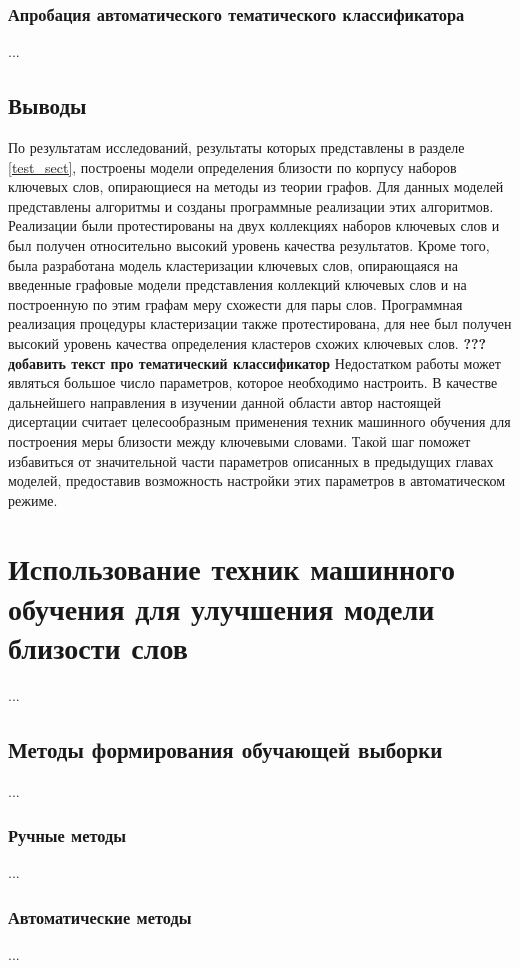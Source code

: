 \subsubsection{Апробация автоматического тематического классификатора}
...
\subsection{Выводы}
По результатам исследований, результаты которых представлены в разделе \ref{test_sect}, построены модели определения близости по корпусу наборов ключевых слов, опирающиеся на методы из теории графов. Для данных моделей представлены алгоритмы и созданы программные реализации этих алгоритмов. Реализации были протестированы на двух коллекциях наборов ключевых слов и был получен относительно высокий уровень качества результатов. Кроме того, была разработана модель кластеризации ключевых слов, опирающаяся на введенные графовые модели представления коллекций ключевых слов и на построенную по этим графам меру схожести для пары слов. Программная реализация процедуры кластеризации также протестирована, для нее был получен высокий уровень качества определения кластеров схожих ключевых слов.
\textbf{??? добавить текст про тематический классификатор}
Недостатком работы может являться большое число параметров, которое необходимо настроить. В качестве дальнейшего направления в изучении данной области автор настоящей дисертации считает целесообразным применения техник машинного обучения для построения меры близости между ключевыми словами. Такой шаг поможет избавиться от значительной части параметров описанных в предыдущих главах моделей, предоставив возможность настройки этих параметров в автоматическом режиме.

\section{Использование техник машинного обучения для улучшения модели близости слов}
...
\subsection{Методы формирования обучающей выборки}
...
\subsubsection{Ручные методы}
...
\subsubsection{Автоматические методы}
...
